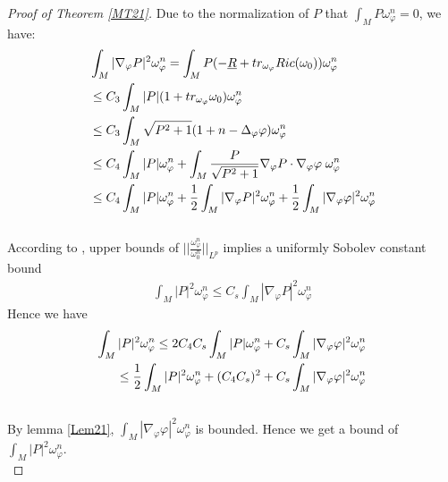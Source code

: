 \documentclass[11pt]{amsart}
\numberwithin{equation}{section}
\begin{document}
\begin{proof}[Proof of Theorem \ref{MT21}]
	
	Due to the normalization of $P$ that $\int_MP\omega_{\varphi}^n=0$,  we have:
	\begin{align}
	&\int_M|\nabla_{\varphi}P|^2\omega_{\varphi}^n =\int_MP(-\underline{R}+tr_{\omega_{\varphi}} Ric(\omega_0))\omega_{\varphi}^n \notag \\
	&\le  C_3 \int_M|P|(1+tr_{\omega_{\varphi}}\omega_0)\omega_{\varphi}^n \notag \\
	&\le  C_3 \int_M\sqrt{P^2+1} (1+n-\Delta_{\varphi}\varphi)\omega_{\varphi}^n \notag \\
	&\le  C_4 \int_M|P|\omega_{\varphi}^n+\int_M\frac{P}{\sqrt{P^2+1}} \nabla_{\varphi}P\cdot \nabla_{\varphi}\varphi\;\omega_{\varphi}^n \notag\\
	& \le  C_4 \int_M|P|\omega_{\varphi}^n + \frac{1}{2} \int_M|\nabla_\varphi P|^2\omega_{\varphi}^n + \frac{1}{2} \int_M|\nabla_\varphi \varphi |^2\omega_{\varphi}^n
	\end{align}\\
According to \cite{GPSS2023}, upper bounds of $||\frac{\omega_{\varphi}^n}{\omega_0^n}||_{L^p}$ implies a uniformly Sobolev constant bound 
\begin{align}
	\int_M |P|^2\omega_\varphi^n \le  C_s \int_M|\nabla_\varphi P|^2 \omega_{\varphi}^n 
\end{align}
Hence we have 
\begin{align}
	\int_M |P|^2\omega_\varphi^n \le  2C_4 C_s \int_M|P|\omega_{\varphi}^n +C_s \int_M|\nabla_\varphi \varphi |^2\omega_{\varphi}^n \notag\\
	\le  \frac{1}{2}\int_M |P|^2\omega_\varphi^n + (C_4C_s)^2+ C_s \int_M|\nabla_\varphi \varphi |^2\omega_{\varphi}^n
\end{align}\\
By lemma \ref{Lem21}, $\int_M|\nabla_\varphi \varphi |^2\omega_{\varphi}^n$ is bounded. Hence we get a bound of $\int_M |P|^2\omega_\varphi^n$. \\


\end{proof}
\end{document}
